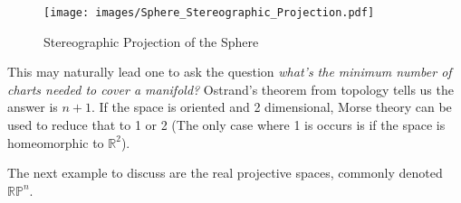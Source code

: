         \begin{figure}[H]
            \centering
            \captionsetup{type=figure}
            \texttt{[image: images/Sphere\_Stereographic\_Projection.pdf]}
            \caption{Stereographic Projection of the Sphere}
            \label{fig:Sphere_Stereographic_Proj}
        \end{figure}
        This may naturally lead one to ask the question
        \textit{what's the minimum number of charts needed to cover a manifold?}
        Ostrand's theorem from topology tells us the answer is $n+1$. If the
        space is oriented and 2 dimensional, Morse theory can be used to reduce
        that to 1 or 2 (The only case where 1 is occurs is if the space is
        homeomorphic to $\mathbb{R}^{2}$).
        \par\hfill\par
        The next example to discuss are the real projective spaces, commonly
        denoted $\mathbb{RP}^{n}$.
